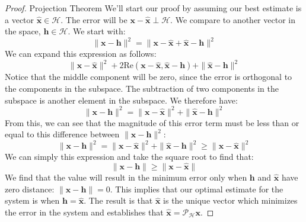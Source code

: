 \begin{proof}{Projection Theorem}
We'll start our proof by assuming our best estimate is a vector $\bm{\hat{x}}\in\mathcal{H}$. The error will be $\bm{x}-\bm{\hat{x}} \perp\mathcal{H}$. We compare to another vector in the space, $\bm{h}\in\mathcal{H}$. We start with:
$$\|\bm{x}-\bm{h}\|^2=\|\bm{x}-\bm{\hat{x}}+\bm{\hat{x}}-\bm{h}\|^2$$
We can expand this expression as follows:
$$\|\bm{x}-\bm{\hat{x}}\|^2+2\mathrm{Re}(\bm{x}-\bm{\hat{x}},\bm{\hat{x}}-\bm{h})+\|\bm{\hat{x}}-\bm{h}\|^2$$
Notice that the middle component will be zero, since the error is orthogonal to the components in the subspace. The subtraction of two components in the subspace is another element in the subspace. We therefore have:
$$\|\bm{x}-\bm{h}\|^2=\|\bm{x}-\bm{\hat{x}}\|^2+\|\bm{\hat{x}}-\bm{h}\|^2$$
From this, we can see that the magnitude of this error term must be less than or equal to this difference between $\|\bm{x}-\bm{h}\|^2$:
$$\|\bm{x}-\bm{h}\|^2=\|\bm{x}-\bm{\hat{x}}\|^2+\|\bm{\hat{x}}-\bm{h}\|^2\ge\|\bm{x}-\bm{\hat{x}}\|^2$$
We can simply this expression and take the square root to find that:
$$\|\bm{{x}}-\bm{h}\|\ge\|\bm{x}-\bm{\hat{x}}\|$$
We find that the value will result in the minimum error only when $\bm{h}$ and $\bm{\hat{x}}$ have zero distance: $\|\bm{\hat{x}}-\bm{h}\|=0$. This implies that our optimal estimate for the system is when $\bm{h}=\bm{\hat{x}}$. The result is that $\bm{\hat{x}}$ is the unique vector which minimizes the error in the system and establishes that $\bm{\hat{x}}=\mathcal{P}_\mathcal{H}\bm{x}$.
\end{proof}

